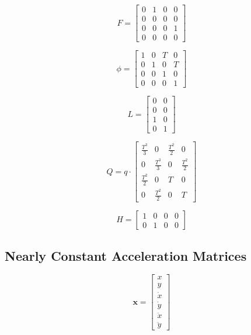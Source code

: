 \documentclass[9pt]{IEEEtran}
\begin{document}
\begin{equation}
    F = \begin{bmatrix}
    0 & 1 & 0 & 0 \\
    0 & 0 & 0 & 0 \\
    0 & 0 & 0 & 1 \\
    0 & 0 & 0 & 0
    \end{bmatrix}
    \end{equation}
    
\begin{equation}
    \phi = \begin{bmatrix}
    1 & 0 & T & 0 \\
    0 & 1 & 0 & T \\
    0 & 0 & 1 & 0 \\
    0 & 0 & 0 & 1
    \end{bmatrix}
\end{equation}

\begin{equation}
    L = \begin{bmatrix}
    0 & 0 \\
    0 & 0 \\
    1 & 0 \\
    0 & 1
    \end{bmatrix}
\end{equation}
    

\begin{equation}
    Q = q \cdot 
    \begin{bmatrix}
    \frac{ T^3}{3} & 0 & \frac{T^2}{2} & 0 \\
    0 & \frac{ T^3}{3} & 0 & \frac{T^2}{2} \\
    \frac{ T^2}{2} & 0 & T & 0 \\
    0 & \frac{ T^2}{2} & 0 & T
    \end{bmatrix}
\end{equation}

\begin{equation}
    H = \begin{bmatrix}
    1 & 0 & 0 & 0 \\
    0 & 1 & 0 & 0
    \end{bmatrix}
    \end{equation}
    

\subsection*{Nearly Constant Acceleration Matrices} %
\begin{equation}
    \textbf{x} = \begin{bmatrix}
    x\\
    y\\
    \dot{x}\\
    \dot{y}\\
    \ddot{x}\\
    \ddot{y}
    \end{bmatrix}
\end{equation}
\end{document}
